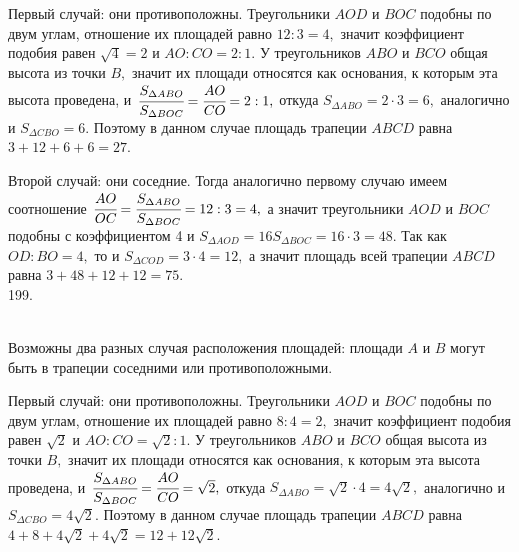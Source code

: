 \documentclass[12pt]{article}
\begin{document}
Первый случай: они противоположны. Треугольники $AOD$ и $BOC$ подобны по двум углам, отношение их площадей равно $12:3=4,$ значит коэффициент подобия равен $\sqrt{4}=2$ и $AO:CO=2:1.$ У треугольников $ABO$ и $BCO$ общая высота из точки $B,$ значит их площади относятся как основания, к которым эта высота проведена, и $\cfrac{S_{\Delta ABO}}{S_{\Delta BOC}}=\cfrac{AO}{CO}=2:1,$ откуда $S_{\Delta ABO}=2\cdot3=6,$ аналогично и $S_{\Delta CBO}=6.$ Поэтому в данном случае площадь трапеции $ABCD$ равна $3+12+6+6=27.$

Второй случай: они соседние. Тогда аналогично первому случаю имеем соотношение $\cfrac{AO}{OC}=\cfrac{S_{\Delta ABO}}{S_{\Delta BOC}}=12:3=4,$ а значит треугольники $AOD$ и $BOC$ подобны с коэффициентом 4 и $S_{\Delta AOD}=16S_{\Delta BOC}=16\cdot3=48.$ Так как $OD:BO=4,$ то и $S_{\Delta COD}=3\cdot4=12,$ а значит площадь всей трапеции $ABCD$ равна $3+48+12+12=75.$\\
199. \begin{figure}[ht!]
\end{figure}\\
Возможны два разных случая расположения площадей: площади $A$ и $B$ могут быть в трапеции соседними или противоположными.

Первый случай: они противоположны. Треугольники $AOD$ и $BOC$ подобны по двум углам, отношение их площадей равно $8:4=2,$ значит коэффициент подобия равен $\sqrt{2}$ и $AO:CO=\sqrt{2}:1.$ У треугольников $ABO$ и $BCO$ общая высота из точки $B,$ значит их площади относятся как основания, к которым эта высота проведена, и $\cfrac{S_{\Delta ABO}}{S_{\Delta BOC}}=\cfrac{AO}{CO}=\sqrt{2},$ откуда $S_{\Delta ABO}=\sqrt{2}\cdot4=4\sqrt{2},$ аналогично и $S_{\Delta CBO}=4\sqrt{2}.$ Поэтому в данном случае площадь трапеции $ABCD$ равна $4+8+4\sqrt{2}+4\sqrt{2}=12+12\sqrt{2}.$
\end{document}
